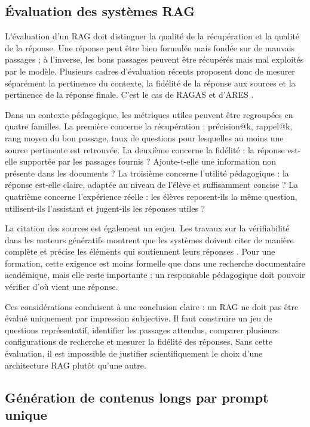 \documentclass[12pt,a4paper]{article}
\begin{document}
\subsection{Évaluation des systèmes RAG}

L'évaluation d'un RAG doit distinguer la qualité de la récupération et la qualité de la
réponse. Une réponse peut être bien formulée mais fondée sur de mauvais passages ; à
l'inverse, les bons passages peuvent être récupérés mais mal exploités par le modèle.
Plusieurs cadres d'évaluation récents proposent donc de mesurer séparément la pertinence
du contexte, la fidélité de la réponse aux sources et la pertinence de la réponse finale.
C'est le cas de RAGAS \cite{es2023ragas} et d'ARES \cite{saadfalcon2023ares}.

Dans un contexte pédagogique, les métriques utiles peuvent être regroupées en quatre
familles. La première concerne la récupération : précision@k, rappel@k, rang moyen du
bon passage, taux de questions pour lesquelles au moins une source pertinente est
retrouvée. La deuxième concerne la fidélité : la réponse est-elle supportée par les passages
fournis ? Ajoute-t-elle une information non présente dans les documents ? La troisième
concerne l'utilité pédagogique : la réponse est-elle claire, adaptée au niveau de l'élève et
suffisamment concise ? La quatrième concerne l'expérience réelle : les élèves reposent-ils
la même question, utilisent-ils l'assistant et jugent-ils les réponses utiles ?

La citation des sources est également un enjeu. Les travaux sur la vérifiabilité dans les
moteurs génératifs montrent que les systèmes doivent citer de manière complète et
précise les éléments qui soutiennent leurs réponses \cite{liu2023evaluating}. Pour une
formation, cette exigence est moins formelle que dans une recherche documentaire
académique, mais elle reste importante : un responsable pédagogique doit pouvoir
vérifier d'où vient une réponse.

Ces considérations conduisent à une conclusion claire : un RAG ne doit pas être évalué
uniquement par impression subjective. Il faut construire un jeu de questions représentatif,
identifier les passages attendus, comparer plusieurs configurations de recherche et
mesurer la fidélité des réponses. Sans cette évaluation, il est impossible de justifier
scientifiquement le choix d'une architecture RAG plutôt qu'une autre.

\subsection{Génération de contenus longs par prompt unique}
\end{document}
